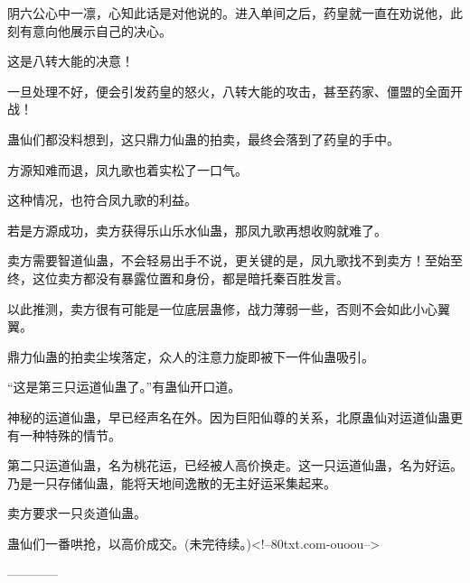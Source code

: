 \begin{this_body}
阴六公心中一凛，心知此话是对他说的。进入单间之后，药皇就一直在劝说他，此刻有意向他展示自己的决心。

这是八转大能的决意！

一旦处理不好，便会引发药皇的怒火，八转大能的攻击，甚至药家、僵盟的全面开战！

蛊仙们都没料想到，这只鼎力仙蛊的拍卖，最终会落到了药皇的手中。

方源知难而退，凤九歌也着实松了一口气。

这种情况，也符合凤九歌的利益。

若是方源成功，卖方获得乐山乐水仙蛊，那凤九歌再想收购就难了。

卖方需要智道仙蛊，不会轻易出手不说，更关键的是，凤九歌找不到卖方！至始至终，这位卖方都没有暴露位置和身份，都是暗托秦百胜发言。

以此推测，卖方很有可能是一位底层蛊修，战力薄弱一些，否则不会如此小心翼翼。

鼎力仙蛊的拍卖尘埃落定，众人的注意力旋即被下一件仙蛊吸引。

“这是第三只运道仙蛊了。”有蛊仙开口道。

神秘的运道仙蛊，早已经声名在外。因为巨阳仙尊的关系，北原蛊仙对运道仙蛊更有一种特殊的情节。

第二只运道仙蛊，名为桃花运，已经被人高价换走。这一只运道仙蛊，名为好运。乃是一只存储仙蛊，能将天地间逸散的无主好运采集起来。

卖方要求一只炎道仙蛊。

蛊仙们一番哄抢，以高价成交。(未完待续。)<!--80txt.com-ouoou-->

------------

\end{this_body}

